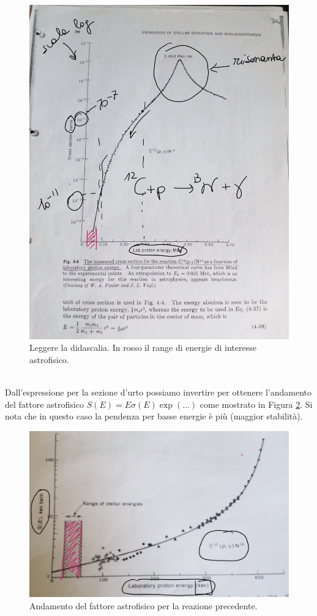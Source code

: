 \begin{figure}[!h]
    \centering
    \includegraphics[scale=0.2]{Immagini/0322_crosssection.png}
    \caption{Leggere la didascalia. In rosso il range di energie di interesse astrofisico.}
    \label{0322_cross}
\end{figure}\\
\noindent Dall'espressione per la sezione d'urto possiamo invertire per ottenere l'andamento del fattore astrofisico $S(E) = E \sigma(E)\exp(\dots)$ come mostrato in Figura \ref{0322_fatastr}. Si nota che in questo caso la pendenza per basse energie è più  (maggior stabilità).

\begin{figure}[h]
    \centering
    \includegraphics[scale=0.3]{Immagini/0322_fattoreastr.png}
    \caption{Andamento del fattore astrofisico per la reazione precedente.}
    \label{0322_fatastr}
\end{figure}
